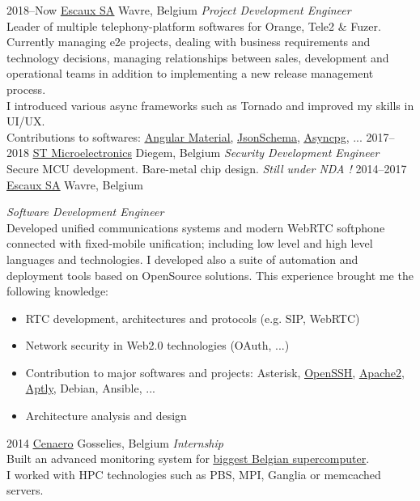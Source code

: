\documentclass[]{friggeri-cv} %
\begin{document}
\begin{entrylist}
\entry
{2018--Now}
{\href{http://escaux.com}{\ul{Escaux SA}}}
{Wavre, Belgium}
{\emph{Project Development Engineer} \\
Leader of multiple telephony-platform softwares for Orange, Tele2 \& Fuzer. Currently managing e2e projects, dealing with business requirements and technology decisions, managing relationships between sales, development and operational teams in addition to implementing a new release management process. \\
I introduced various async frameworks such as Tornado and improved my skills in UI/UX. \\
Contributions to softwares: \href{https://github.com/angular/components/issues/13862}{\ul{Angular Material}}, \href{https://github.com/Julian/jsonschema/issues/499}{\ul{JsonSchema}}, \href{https://github.com/MagicStack/asyncpg/issues/359}{\ul{Asyncpg}}, ...
}
\entry
{2017--2018}
{\href{https://www.st.com}{\ul{ST Microelectronics}}}
{Diegem, Belgium}
{\emph{Security Development Engineer} \\
Secure MCU development. Bare-metal chip design. \emph{Still under NDA !}
}
\entry
{2014--2017}
{\href{http://escaux.com}{\ul{Escaux SA}}}
{Wavre, Belgium}
{\emph{Software Development Engineer} \\
Developed unified communications systems and modern WebRTC softphone connected with fixed-mobile unification; including low level and high level languages and technologies. I developed also a suite of automation and deployment tools based on OpenSource solutions. This experience brought me the following knowledge:
\begin{itemize}
\item RTC development, architectures and protocols (e.g. SIP, WebRTC)
\item Network security in Web2.0 technologies (OAuth, ...)
\item Contribution to major softwares and projects: Asterisk, \href{http://lists.mindrot.org/pipermail/openssh-unix-dev/2016-December/035563.html}{\ul{OpenSSH}}, \href{https://github.com/rmedaer/mod_psm}{\ul{Apache2}}, \href{https://github.com/smira/aptly/pull/390}{\ul{Aptly}}, Debian, Ansible, ...
\item Architecture analysis and design
\end{itemize}}
\entry
{2014}
{\href{http://www.cenaero.be/}{\ul{Cenaero}}}
{Gosselies, Belgium}
{\emph{Internship} \\
Built an advanced monitoring system for \href{https://www.top500.org/system/178439}{\ul{biggest Belgian supercomputer}}. \\
I worked with HPC technologies such as PBS, MPI, Ganglia or memcached servers.}
\end{entrylist}
\end{document}
